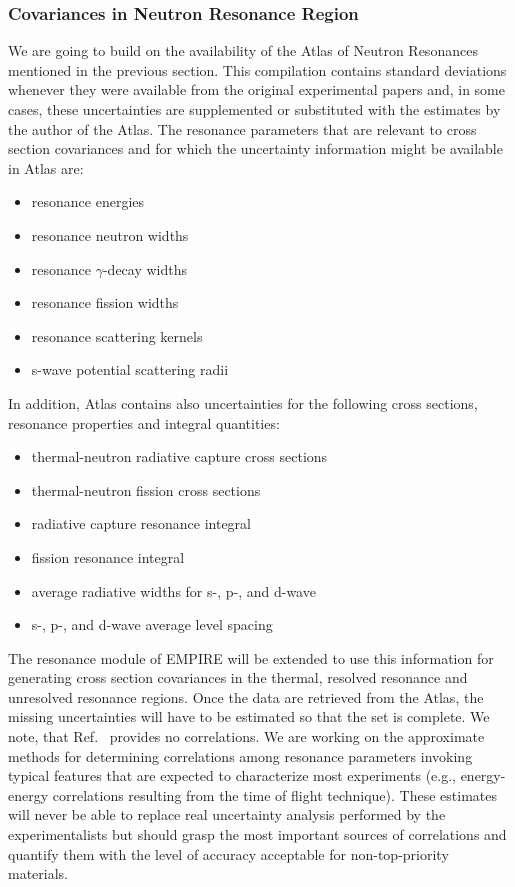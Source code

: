 \documentclass[twocolumn,amsmath,amssymb,10pt,groupedaddress,a4paper]{revtex4}
\begin{document}
\subsubsection{Covariances in Neutron Resonance Region}
We are going to build on the availability of the Atlas of Neutron Resonances~\cite{Mughabghab:06} mentioned in the previous section. This compilation contains standard deviations whenever they were available from the original experimental papers and,  in some cases, these uncertainties are supplemented or substituted with the estimates by the author of the Atlas. The resonance parameters that are relevant to cross section covariances and for which the uncertainty information might be available in Atlas are:
\begin{itemize}
\item resonance energies
\item resonance neutron widths
\item resonance $\gamma$-decay widths
\item resonance fission widths
\item resonance scattering kernels
\item s-wave potential scattering radii
\end{itemize}
In addition, Atlas contains also uncertainties for the following cross sections, resonance properties and integral quantities:
\begin{itemize}
\item thermal-neutron radiative capture cross sections
\item thermal-neutron fission cross sections
\item radiative capture resonance integral
\item fission resonance integral
\item average radiative widths for s-, p-, and d-wave
\item  s-, p-, and d-wave average level spacing
\end{itemize}

The resonance module of EMPIRE will be extended to use this information for generating cross section covariances in the thermal, resolved resonance and unresolved resonance regions. Once the data are retrieved from the Atlas, the missing uncertainties will have to be estimated so that the set is complete. We note, that Ref.~\cite{Mughabghab:06} provides no correlations. We are working on the approximate methods for determining correlations among resonance parameters invoking typical features that are expected to characterize most experiments (e.g., energy-energy correlations resulting from the time of flight technique). These estimates will never be able to replace real uncertainty analysis performed by the experimentalists but should grasp the most important sources of correlations and quantify them with the level of accuracy acceptable for non-top-priority materials.
\end{document}
